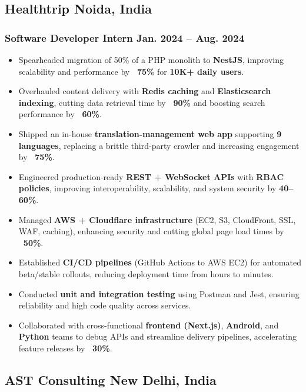 \documentclass[letterpaper,11pt]{article}
\newcommand{\rside}[1]{
  \hfill {\small\color{accent} #1}%
}
\begin{document}
\subsection{Healthtrip \rside{Noida, India}}
\subsubsection{Software Developer Intern \rside{Jan. 2024 -- Aug. 2024}}
\begin{itemize}
  \item Spearheaded migration of 50\% of a PHP monolith to \textbf{NestJS}, improving scalability and performance by \textbf{~75\%} for \textbf{10K+ daily users}.
  \item Overhauled content delivery with \textbf{Redis caching} and \textbf{Elasticsearch indexing}, cutting data retrieval time by \textbf{~90\%} and boosting search performance by \textbf{~60\%}.
  \item Shipped an in-house \textbf{translation-management web app} supporting \textbf{9 languages}, replacing a brittle third-party crawler and increasing engagement by \textbf{~75\%}.
  \item Engineered production-ready \textbf{REST + WebSocket APIs} with \textbf{RBAC policies}, improving interoperability, scalability, and system security by \textbf{40--60\%}.
  \item Managed \textbf{AWS + Cloudflare infrastructure} (EC2, S3, CloudFront, SSL, WAF, caching), enhancing security and cutting global page load times by \textbf{~50\%}.
  \item Established \textbf{CI/CD pipelines} (GitHub Actions to AWS EC2) for automated beta/stable rollouts, reducing deployment time from hours to minutes.
  \item Conducted \textbf{unit and integration testing} using Postman and Jest, ensuring reliability and high code quality across services.
  \item Collaborated with cross-functional \textbf{frontend (Next.js)}, \textbf{Android}, and \textbf{Python} teams to debug APIs and streamline delivery pipelines, accelerating feature releases by \textbf{~30\%}.
\end{itemize}

\subsection{AST Consulting \rside{New Delhi, India}}
\end{document}
